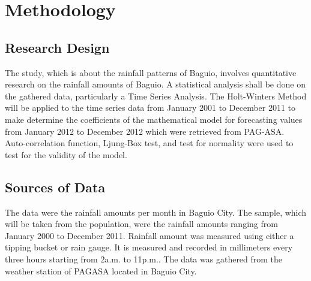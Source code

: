\chapter{Methodology}



{}
\section*{Research Design}

The study, which is about the rainfall patterns of Baguio, involves quantitative research on the rainfall amounts of Baguio. A statistical analysis shall be done on the gathered data, particularly a Time Series Analysis. The Holt-Winters Method will be applied to the time series data from January 2001 to December 2011 to make determine the coefficients of the mathematical model for forecasting values from January 2012 to December 2012 which were retrieved from PAG-ASA. Auto-correlation function, Ljung-Box test, and test for normality were used to test for the validity of the model.

\section*{Sources of Data}

The data were the rainfall amounts per month in Baguio City. The sample, which will be taken from the population, were the rainfall amounts ranging from January 2000 to December 2011. Rainfall amount was measured using either a tipping bucket or rain gauge. It is measured and recorded in millimeters every three hours starting from 2a.m. to 11p.m.. The data was gathered from the weather station of PAGASA located in Baguio City.


